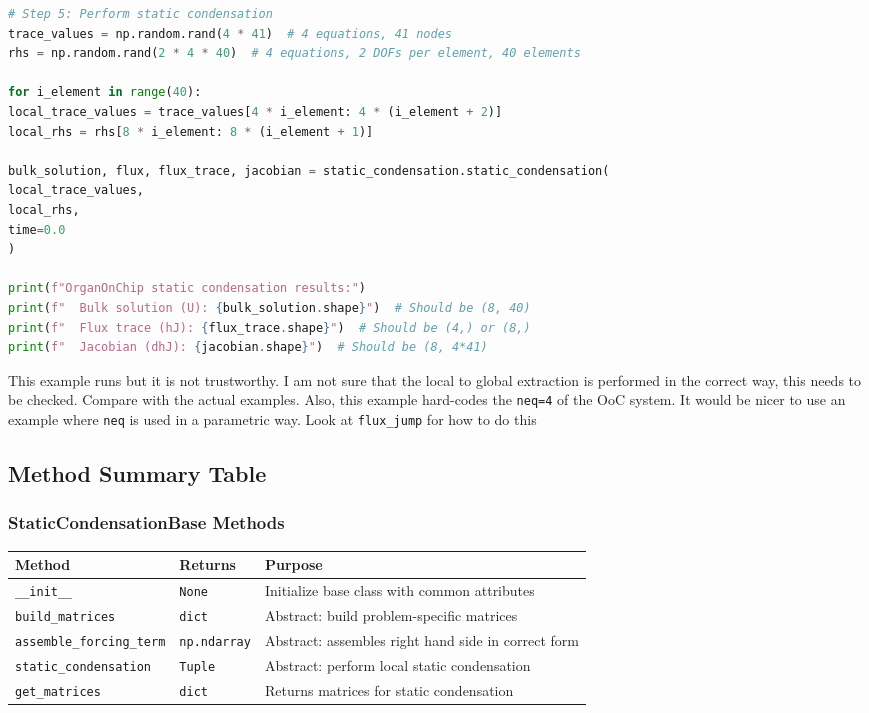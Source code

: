 \begin{lstlisting}[language=Python, caption=Complete OrganOnChip Workflow]
# Step 5: Perform static condensation 
trace_values = np.random.rand(4 * 41)  # 4 equations, 41 nodes
rhs = np.random.rand(2 * 4 * 40)  # 4 equations, 2 DOFs per element, 40 elements

for i_element in range(40):
local_trace_values = trace_values[4 * i_element: 4 * (i_element + 2)]
local_rhs = rhs[8 * i_element: 8 * (i_element + 1)]

bulk_solution, flux, flux_trace, jacobian = static_condensation.static_condensation(
local_trace_values,
local_rhs,
time=0.0
)

print(f"OrganOnChip static condensation results:")
print(f"  Bulk solution (U): {bulk_solution.shape}")  # Should be (8, 40)
print(f"  Flux trace (hJ): {flux_trace.shape}")  # Should be (4,) or (8,)
print(f"  Jacobian (dhJ): {jacobian.shape}")  # Should be (8, 4*41)
\end{lstlisting}

\begin{warningbox}
	This example runs but it is not trustworthy. I am not sure that the local to global extraction is performed in the correct way, this needs to be checked. Compare with the actual examples. Also, this example hard-codes the {\tt neq=4} of the OoC system. It would be nicer to use an example where {\tt neq} is used in a parametric way. Look at {\tt flux\_jump} for how to do this
\end{warningbox}



\subsection{Method Summary Table}
\label{subsec:static_condensation_method_summary}

\subsubsection{StaticCondensationBase Methods}

\begin{longtable}{|p{5.5cm}|p{2cm}|p{7cm}|}
\hline
\textbf{Method} & \textbf{Returns} & \textbf{Purpose} \\
\hline
\endhead

\texttt{\_\_init\_\_} & \texttt{None} & Initialize base class with common attributes \\
\hline

\texttt{build\_matrices} & \texttt{dict} & Abstract: build problem-specific matrices \\
\hline

\texttt{assemble\_forcing\_term} & \texttt{np.ndarray} & Abstract: assembles right hand side in correct form\\
\hline

\texttt{static\_condensation} & \texttt{Tuple} & Abstract: perform local static condensation \\
\hline


\texttt{get\_matrices} & \texttt{dict} & Returns matrices for static condensation\\
\hline

\end{longtable}

